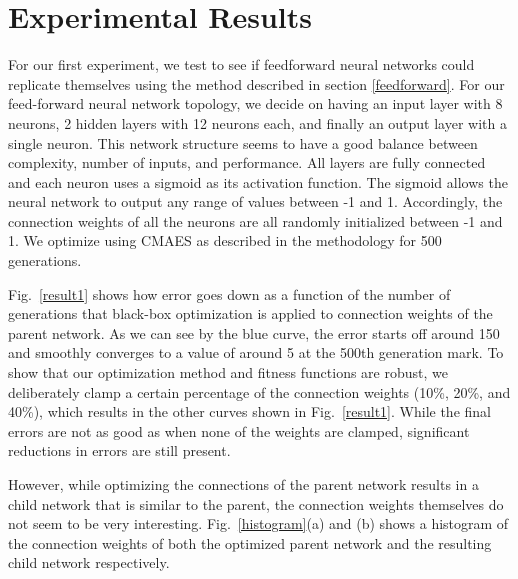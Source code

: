 \documentclass[12pt]{article}
\begin{document}
\section{Experimental Results}
\label{results}

For our first experiment,
we test to see if feedforward neural networks
could replicate themselves using the method described
in section \ref{feedforward}.
For our feed-forward neural network topology,
we decide on having an input layer with 8 neurons,
2 hidden layers with 12 neurons each,
and finally an output layer with a single neuron.
This network structure seems to have a good balance
between complexity, number of inputs, and performance.
All layers are fully connected
and each neuron uses a sigmoid
as its activation function.
The sigmoid allows the neural network
to output any range of values between -1 and 1.
Accordingly, the connection weights
of all the neurons are all randomly initialized between -1 and 1.
We optimize using CMAES
as described in the methodology for 500 generations.

Fig.~\ref{result1} shows how error goes down
as a function of the number of generations
that black-box optimization is applied
to connection weights of the parent network.
As we can see by the blue curve,
the error starts off around 150 and smoothly converges
to a value of around 5 at the 500th generation mark.
To show that our optimization method
and fitness functions are robust,
we deliberately clamp a certain percentage
of the connection weights (10\%, 20\%, and 40\%),
which results in the other curves
shown in Fig.~\ref{result1}.
While the final errors are not as good
as when none of the weights are clamped,
significant reductions in errors are still present.

However, while optimizing the connections
of the parent network results in a child network
that is similar to the parent,
the connection weights themselves do not seem
to be very interesting.
Fig.~\ref{histogram}(a) and (b) shows a histogram
of the connection weights
of both the optimized parent network
and the resulting child network respectively.
\end{document}
